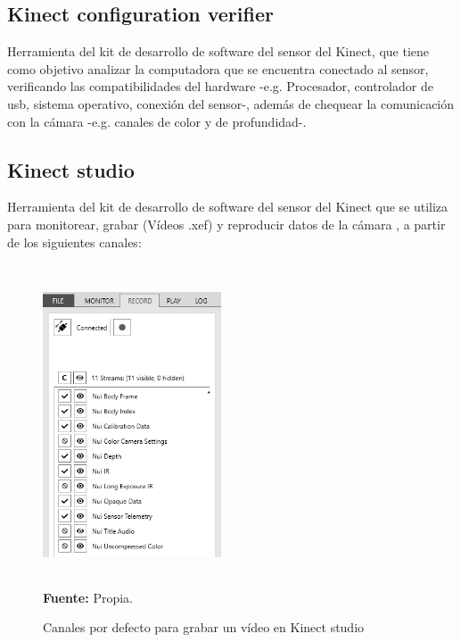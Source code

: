 \subsection{Kinect configuration verifier} \label{ins:KinectCheckt}
Herramienta del kit de desarrollo de software del sensor del Kinect, que tiene como objetivo  analizar la computadora que se encuentra conectado al sensor, verificando las compatibilidades del hardware -e.g. Procesador, controlador de usb, sistema operativo, conexi\'on del sensor-, adem\'as de chequear la comunicaci\'on con la c\'amara -e.g. canales de color y de profundidad-.
\subsection{Kinect studio} \label{ins:KinectStudio}
Herramienta del kit de desarrollo de software del sensor del Kinect que se utiliza para monitorear, grabar (V\'ideos .xef) y reproducir datos de la c\'amara \cite{KinectStudio2019}, a partir de los siguientes canales:
\begin{figure}[H]
	\caption{Canales por defecto para grabar un v\'ideo en Kinect studio }
	\label{fig:streamDefault}
	\centering
	\includegraphics[width=200px,height=360px]{graphics/streamsRecord.PNG} \\
	\textbf{Fuente:} Propia.
\end{figure} 
